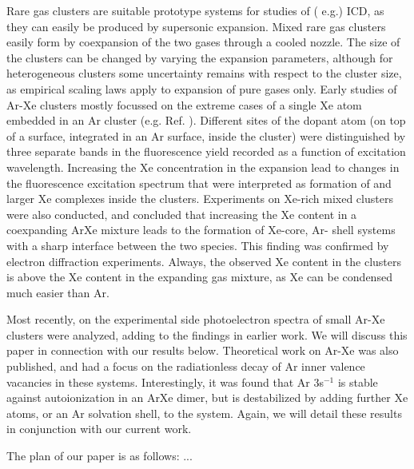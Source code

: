 Rare gas clusters are suitable prototype systems for studies of (
e.g.) ICD, as they can easily be produced by supersonic 
expansion. Mixed rare gas clusters easily form by coexpansion of 
the two gases through a cooled nozzle. The size of the clusters 
can be changed by varying the expansion parameters, although for 
heterogeneous clusters some uncertainty remains with respect to 
the cluster size, as empirical scaling laws \cite{hagena1981} 
apply to expansion of pure gases only. Early studies of Ar-Xe 
clusters mostly focussed on the extreme cases of a single Xe atom 
embedded in an Ar cluster (e.g. Ref. ). 
Different sites of the dopant atom (on top of a surface, 
integrated in an Ar surface, inside the cluster) were 
distinguished by three separate bands in the fluorescence yield 
recorded as a function of excitation wavelength.\cite{lengenprl} 
Increasing the Xe concentration in the expansion lead to changes 
in the fluorescence excitation spectrum that were interpreted as 
formation of  and larger Xe complexes inside the clusters.
\cite{lengen} Experiments on Xe-rich mixed clusters were also 
conducted, and concluded that increasing the Xe content in a 
coexpanding ArXe mixture leads to the formation of Xe-core, Ar-
shell systems with a sharp interface between the two species.\cite
{tchaplyguine,hoener} This finding was confirmed by electron 
diffraction experiments.\cite{Danylchenko} Always, the observed 
Xe content in the clusters is above the Xe content in the 
expanding gas mixture, as Xe can be condensed much easier than Ar.

Most recently, on the experimental side photoelectron spectra of 
small Ar-Xe clusters were analyzed, adding to the findings in 
earlier work.\cite{Lindblad} We will discuss this paper in 
connection with our results below. Theoretical work on Ar-Xe was 
also published, and had a focus on the radiationless decay of Ar 
inner valence vacancies in these systems.\cite{fasshauer,Fasshauer13}
Interestingly, it was found that Ar 3s$^{-1}$ is stable 
against autoionization in an ArXe dimer, but is destabilized by 
adding further Xe atoms, or an Ar solvation shell, to the system. 
Again, we will detail these results in conjunction with our 
current work.

The plan of our paper is as follows: ...



